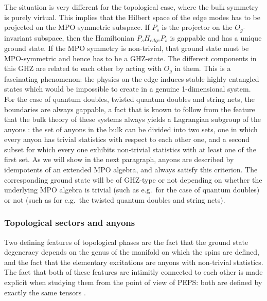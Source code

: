\documentclass[rmp,aps,reprint,superscriptaddress,nobalancelastpage]{revtex4-1}
\begin{document}
The situation is very different for the topological case, where the bulk symmetry is purely virtual. This implies that the Hilbert space of the edge modes has to be projected on the MPO symmetric subspace. If $P_s$ is the projector on the $O_g$-invariant subspace, then the Hamiltonian $P_sH_{edge}P_s$ is gappable and has a unique ground state. If the MPO symmetry is non-trivial, that ground state must be MPO-symmetric and hence has to be a GHZ-state. The different components in this GHZ are related to each other by acting with $O_g$ in them. This is a fascinating phenomenon: the physics on the edge induces stable highly entangled states which would be impossible to create in a genuine 1-dimensional system. For the case of quantum doubles, twisted quantum doubles and string nets, the boundaries are always gappable, a fact that is known to follow from the feature that the bulk theory of these systems always yields a Lagrangian subgroup of the anyons \cite{kitaev:gapped-boundaries,levin:Lagrangian}:  the set of  anyons in the bulk can be divided into two sets, one in which every anyon has trivial statistics with respect to each other one, and a second subset for which every one exhibits non-trivial statistics with at least one of the first set. As we will show in the next paragraph, anyons are described by idempotents of an extended MPO algebra, and always satisfy this criterion. The corresponding ground state will be of GHZ-type or not depending on whether the underlying MPO algebra is trivial (such as e.g.\ for the case of quantum doubles) or not (such as for e.g.\ the twisted quantum doubles and string nets).




\subsubsection{Topological sectors and anyons} \label{tsaa}
Two defining features of topological phases are the fact that the ground state degeneracy depends on the genus of the manifold on which the spins are defined, and the fact that the elementary excitations are anyons with non-trivial statistics. The fact that both of these features are intimitly connected to each other is made explicit when studying them from the point of view of PEPS: both are defined by exactly the same tensors \cite{schuch:peps-sym,bultinck:mpo-anyons}.
\end{document}
